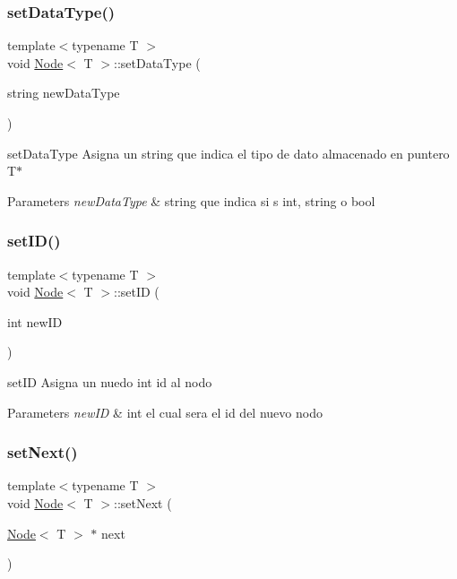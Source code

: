 \subsubsection{\texorpdfstring{set\+Data\+Type()}{setDataType()}}
{\footnotesize\ttfamily template$<$typename T $>$ \\
void \hyperlink{class_node}{Node}$<$ T $>$\+::set\+Data\+Type (\begin{DoxyParamCaption}\item[{string}]{new\+Data\+Type }\end{DoxyParamCaption})}



set\+Data\+Type Asigna un string que indica el tipo de dato almacenado en puntero T$\ast$ 


\begin{DoxyParams}{Parameters}
{\em new\+Data\+Type} & string que indica si s int, string o bool \\
\hline
\end{DoxyParams}
\mbox{\label{class_node_af8fc96f8c1fe1948973eedfd3383d9e6}} 
\subsubsection{\texorpdfstring{set\+I\+D()}{setID()}}
{\footnotesize\ttfamily template$<$typename T $>$ \\
void \hyperlink{class_node}{Node}$<$ T $>$\+::set\+ID (\begin{DoxyParamCaption}\item[{int}]{new\+ID }\end{DoxyParamCaption})}



set\+ID Asigna un nuedo int id al nodo 


\begin{DoxyParams}{Parameters}
{\em new\+ID} & int el cual sera el id del nuevo nodo \\
\hline
\end{DoxyParams}
\mbox{\label{class_node_ac53cb74d17df1997e438e7f34e7b43f0}} 
\subsubsection{\texorpdfstring{set\+Next()}{setNext()}}
{\footnotesize\ttfamily template$<$typename T $>$ \\
void \hyperlink{class_node}{Node}$<$ T $>$\+::set\+Next (\begin{DoxyParamCaption}\item[{\hyperlink{class_node}{Node}$<$ T $>$ $\ast$}]{next }\end{DoxyParamCaption})}



